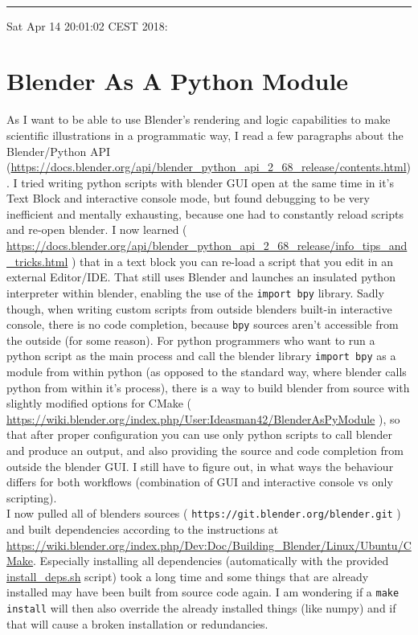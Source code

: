 \documentclass[12pt]{article}
\begin{document}
\ \\ \noindent\rule{\textwidth}{1pt}
Sat Apr 14 20:01:02 CEST 2018: \\
\section*{Blender As A Python Module}
As I want to be able to use Blender's rendering and logic capabilities to make scientific illustrations in a programmatic way, I read a few paragraphs about the Blender/Python API (\url{https://docs.blender.org/api/blender_python_api_2_68_release/contents.html}). I tried writing python scripts with blender GUI open at the same time in it's Text Block and interactive console mode, but found debugging to be very inefficient and mentally exhausting, because one had to constantly reload scripts and re-open blender. I now learned ( \url{https://docs.blender.org/api/blender_python_api_2_68_release/info_tips_and_tricks.html} ) that in a text block you can re-load a script that you edit in an external Editor/IDE. That still uses Blender and launches an insulated python interpreter within blender, enabling the use of the \texttt{import bpy} library. Sadly though, when writing custom scripts from outside blenders built-in interactive console, there is no code completion, because \texttt{bpy} sources aren't accessible from the outside (for some reason). For python programmers who want to run a python script as the main process and call the blender library \texttt{import bpy} as a module from within python (as opposed to the standard way, where blender calls python from within it's process), there is a way to build blender from source with slightly modified options for CMake ( \url{https://wiki.blender.org/index.php/User:Ideasman42/BlenderAsPyModule} ), so that after proper configuration you can use only python scripts to call blender and produce an output, and also providing the source and code completion from outside the blender GUI. I still have to figure out, in what ways the behaviour differs for both workflows (combination of GUI and interactive console vs only scripting).  \\
I now pulled all of blenders sources ( \texttt{https://git.blender.org/blender.git} ) and built dependencies according to the instructions at \url{https://wiki.blender.org/index.php/Dev:Doc/Building_Blender/Linux/Ubuntu/CMake}. Especially installing all dependencies (automatically with the provided \url{install_deps.sh} script) took a long time and some things that are already installed may have been built from source code again. I am wondering if a \texttt{make install} will then also override the already installed things (like numpy) and if that will cause a broken installation or redundancies. \\
\end{document}
